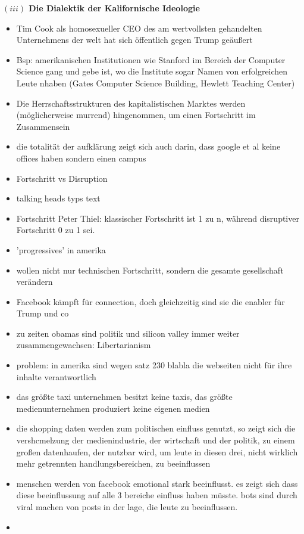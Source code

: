 \documentclass[a4paper, 12pt]{article}
\begin{document}
\begin{onehalfspace}
\vspace{5mm}
\noindent\textbf{$(iii)$ Die Dialektik der Kalifornische Ideologie}

\noindent 

\begin{itemize}
  \item Tim Cook als homosexueller CEO des am wertvollsten gehandelten Unternehmens der welt hat sich öffentlich gegen Trump geäußert
  \item Bsp: amerikanischen Institutionen wie Stanford im Bereich der Computer Science gang und gebe ist, wo die Institute sogar Namen	 von erfolgreichen Leute nhaben (Gates Computer Science Building, Hewlett Teaching Center) 
  \item Die Herrschaftsstrukturen des kapitalistischen Marktes werden (möglicherweise murrend) hingenommen, um einen Fortschritt im Zusammensein 
  \item die totalität der aufklärung zeigt sich auch darin, dass google et al keine offices haben sondern einen campus
  \item Fortschritt vs Disruption
  \item talking heads typs text
  \item Fortschritt Peter Thiel: klassischer Fortschritt ist 1 zu n, während disruptiver Fortschritt 0 zu 1 sei.
  \item 'progressives' in amerika
  \item wollen nicht nur technischen Fortschritt, sondern die gesamte gesellschaft verändern
  \item Facebook kämpft für connection, doch gleichzeitig sind sie die enabler für Trump und co
  \item zu zeiten obamas sind politik und silicon valley immer weiter zusammengewachsen: Libertarianism 
  \item problem: in amerika sind wegen satz 230 blabla die webseiten nicht für ihre inhalte verantwortlich
  \item das größte taxi unternehmen besitzt keine taxis, das größte medienunternehmen produziert keine eigenen medien
  \item die shopping daten werden zum politischen einfluss genutzt, so zeigt sich die vershcmelzung der medienindustrie, der wirtschaft und der politik, zu einem großen datenhaufen, der nutzbar wird, um leute in diesen drei, nicht wirklich mehr getrennten handlungsbereichen, zu beeinflussen
  \item menschen werden von facebook emotional stark beeinflusst. es zeigt sich dass diese beeinflussung auf alle 3 bereiche einfluss haben müsste. bots sind durch viral machen von posts in der lage, die leute zu beeinflussen. 
  \item 
\end{itemize}



\end{onehalfspace}
\end{document}
